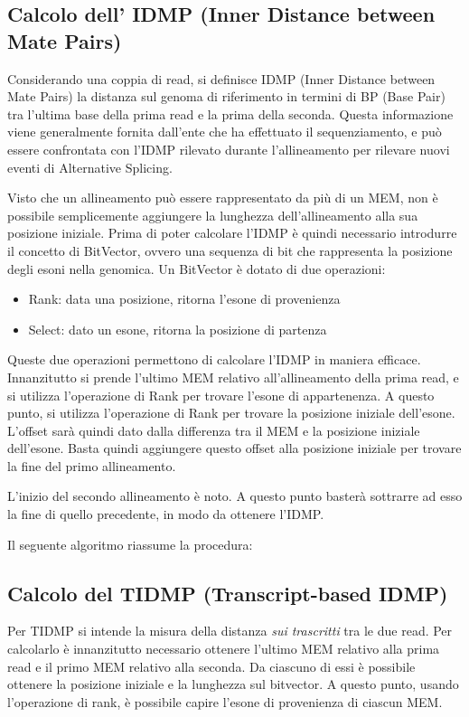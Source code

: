 
\newpage

\subsection{Calcolo dell' IDMP (Inner Distance between Mate Pairs)}
Considerando una coppia di read, si definisce IDMP (Inner Distance between Mate Pairs) la distanza sul genoma di riferimento in termini di BP (Base Pair) tra l'ultima base della prima read e la prima della seconda. Questa informazione viene generalmente fornita dall'ente che ha effettuato il sequenziamento, e può essere confrontata con l'IDMP rilevato durante l'allineamento per rilevare nuovi eventi di Alternative Splicing.

Visto che un allineamento può essere rappresentato da più di un MEM, non è possibile semplicemente aggiungere la lunghezza dell'allineamento alla sua posizione iniziale. Prima di poter calcolare l'IDMP è quindi necessario introdurre il concetto di BitVector, ovvero una sequenza di bit che rappresenta la posizione degli esoni nella genomica. Un BitVector è dotato di due operazioni:

\begin{itemize}
	\item Rank: data una posizione, ritorna l'esone di provenienza
	\item Select: dato un esone, ritorna la posizione di partenza 
\end{itemize}

Queste due operazioni permettono di calcolare l'IDMP in maniera efficace. Innanzitutto si prende l'ultimo MEM relativo all'allineamento della prima read, e si utilizza l'operazione di Rank per trovare l'esone di appartenenza. A questo punto, si utilizza l'operazione di Rank per trovare la posizione iniziale dell'esone. L'offset sarà quindi dato dalla differenza tra il MEM e la posizione iniziale dell'esone. Basta quindi aggiungere questo offset alla posizione iniziale per trovare la fine del primo allineamento.

L'inizio del secondo allineamento è noto. A questo punto basterà sottrarre ad esso la fine di quello precedente, in modo da ottenere l'IDMP.

Il seguente algoritmo riassume la procedura:

\newpage

\subsection{Calcolo del TIDMP (Transcript-based IDMP)}
Per TIDMP si intende la misura della distanza \textit{sui trascritti} tra le due read. Per calcolarlo è innanzitutto necessario ottenere l'ultimo MEM relativo alla prima read e il primo MEM relativo alla seconda. Da ciascuno di essi è possibile ottenere la posizione iniziale e la lunghezza sul bitvector. A questo punto, usando l'operazione di rank, è possibile capire l'esone di provenienza di ciascun MEM.

